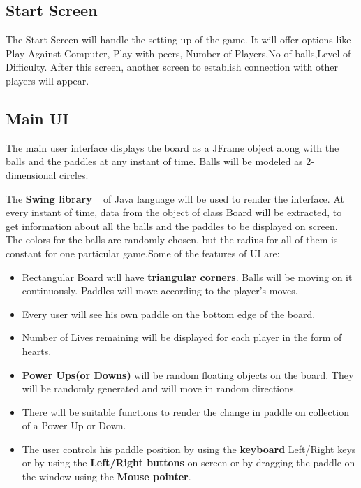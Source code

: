 \documentclass{article}
\begin{document}
    	\subsection{Start Screen}
    	The Start Screen will handle the setting up of the game. It will offer options like Play Against Computer, Play with peers, Number of Players,No of balls,Level of Difficulty. After this screen, another screen to establish connection with other players will appear.

    	\subsection{Main UI}
    	The main user interface displays the board as a JFrame object along with the balls and the paddles at any instant of time. Balls will be modeled as 2-dimensional circles.
    	\par\noindent The \textbf{Swing library} ~\cite{swing_java} of Java language will be used to render the interface. At every instant of time, data from the object of class Board will be extracted, to get information about all the balls and the paddles to be displayed on screen. The colors for the balls are randomly chosen, but the radius for all of them is constant for one particular game.Some of the features of UI are:
    	\begin{itemize}
    	\item Rectangular Board will have \textbf{triangular corners}. Balls will be moving on it continuously. Paddles will move according to the player's moves.
    	\item Every user will see his own paddle on the bottom edge of the board.
    	\item Number of Lives remaining will be displayed for each player in the form of hearts.
    	\item \textbf{Power Ups(or Downs)} will be random floating objects on the board. They will be randomly generated and will move in random directions.
    	\item There will be suitable functions to render the change in paddle on collection of a Power Up or Down.
    	\item The user controls his paddle position by using the \textbf{keyboard} Left/Right keys or by using the \textbf{Left/Right buttons} on screen or by dragging the paddle on the window using the \textbf{Mouse pointer}.
    	\end{itemize}
\end{document}
